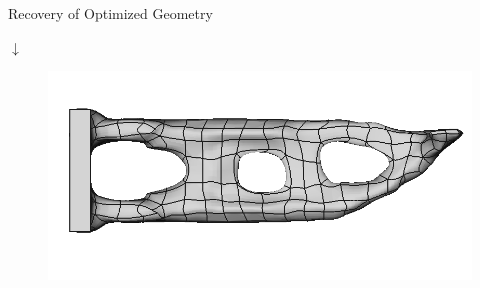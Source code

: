 \begin{frame}{Recovery of Optimized Geometry}
\begin{minipage}[t]{0.45\linewidth}
\begin{figure}
		\end{figure}
		\vspace{-0.75cm}
		\begin{center}
			$\downarrow$
		\end{center}
		\vspace{-0.6cm}
		\begin{figure}
			\includegraphics[width=.88\textwidth]{Pictures/SecondHalf/Back2CAD3}
		\end{figure}
	\end{minipage}
\end{frame}
